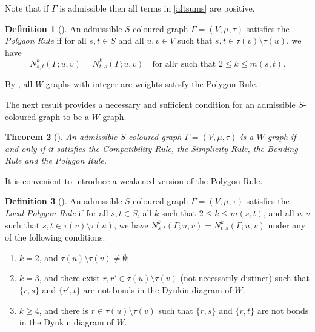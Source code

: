 \documentclass[10pt]{amsart}
\newtheorem{theo}{Theorem}[section]
\theoremstyle{definition}
\newtheorem{defi}[theo]{Definition}
\newcommand{\citex}[2]{\cite[#1]{#2}}
\begin{document}
Note that if $\Gamma$ is admissible then all terms in \eqref{altsums} are positive.

\begin{defi}[{\citex{Definition~2.9}{stem:morewgraph}}]\label{polygon}
An admissible $S$-coloured graph $\Gamma = (V,\mu,\tau)$ satisfies the
\emph{Polygon Rule}
if for all $s,t\in S$ and all $u, v\in V$ such
that $s,t\in\tau(v)\setminus \tau(u)$, we have
\begin{equation*}
N_{s,t}^{k}(\Gamma;u,v) = N_{t,s}^{k}(\Gamma;u,v) \quad \text{for all
$r$ such that $2 \leqslant k \leqslant m(s,t)$}.
\end{equation*}
\end{defi}
By \cite[Proposition~4.7]{stem:addwgraph}, all $W\!$-graphs with integer arc
weights satisfy the Polygon Rule.

The next result provides a necessary and sufficient condition for an
admissible $S$-coloured graph to be a $W\!$-graph.

\begin{theo}[{\citex{Theorem~4.9}{stem:addwgraph}}]\label{combinatorialCharacterisation}
An admissible $S$-coloured graph $\Gamma = (V,\mu,\tau)$ is a $W\!$-graph
if and only if it satisfies the
Compatibility Rule, the Simplicity Rule, the Bonding Rule and the Polygon Rule.
\end{theo}
It is convenient to introduce a weakened version of the
Polygon Rule.
\begin{defi}[{\citex{Definition~2.9}{stem:morewgraph}}]\label{localpolygon}
An admissible $S$-coloured graph $\Gamma = (V,\mu,\tau)$ satisfies the
\emph{Local Polygon Rule}
if for all $s,t\in S$, all $k$ such that
$2\leqslant k\leqslant m(s,t)$, and all $u, v$ such that
$s,t\in\tau(v)\setminus \tau(u)$, we have
$N_{s,t}^{k}(\Gamma;u,v) = N_{t,s}^{k}(\Gamma;u,v)$
under any of the following conditions:
\begin{enumerate}[label=(\roman*),topsep=1 pt]
\item $k=2$, and $\tau(u)\setminus\tau(v)\ne\emptyset$;
\item $k=3$, and there exist $r,r'\in\tau(u)\setminus\tau(v)$
(not necessarily distinct) such that
$\{r,s\}$ and $\{r',t\}$ are not bonds in the Dynkin diagram of $W$;
\item $k\geqslant 4$, and there is $r\in\tau(u)\setminus\tau(v)$ such that
$\{r,s\}$ and $\{r,t\}$ are not bonds in the Dynkin diagram of $W$.
\end{enumerate}
\end{defi}
\end{document}
